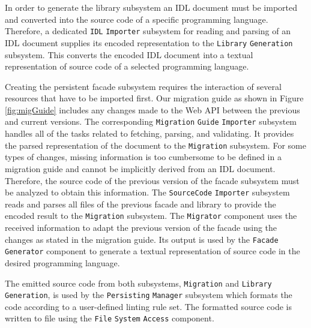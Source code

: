 In order to generate the library subsystem an IDL document must be imported and converted into the source code of a specific programming language. Therefore, a dedicated \texttt{IDL} \texttt{Importer} subsystem for reading and parsing of an IDL document supplies its encoded representation to the \texttt{Library} \texttt{Generation} subsystem. This converts the encoded IDL document into a textual representation of source code of a selected programming language. 

Creating the persistent facade subsystem requires the interaction of several resources that have to be imported first. Our migration guide as shown in Figure \ref{fig:migGuide} includes any changes made to the Web API between the previous and current versions. The corresponding \texttt{Migration} \texttt{Guide} \texttt{Importer} subsystem handles all of the tasks related to fetching, parsing, and validating. It provides the parsed representation of the document to the \texttt{Migration} subsystem. For some types of changes, missing information is too cumbersome to be defined in a migration guide and cannot be implicitly derived from an IDL document. Therefore, the source code of the previous version of the facade subsystem must be analyzed to obtain this information. The \texttt{SourceCode} \texttt{Importer} subsystem reads and parses all files of the previous facade and library to provide the encoded result to the \texttt{Migration} subsystem. The \texttt{Migrator} component uses the received information to adapt the previous version of the facade using the changes as stated in the migration guide. Its output is used by the \texttt{Facade} \texttt{Generator} component to generate a textual representation of source code in the desired programming language. 

The emitted source code from both subsystems, \texttt{Migration} and \texttt{Library} \texttt{Gen\-er\-a\-tion}, is used by the \texttt{Persisting} \texttt{Manager} subsystem which formats the code according to a user-defined linting rule set. The formatted source code is written to file using the \texttt{File} \texttt{System} \texttt{Access} component.


